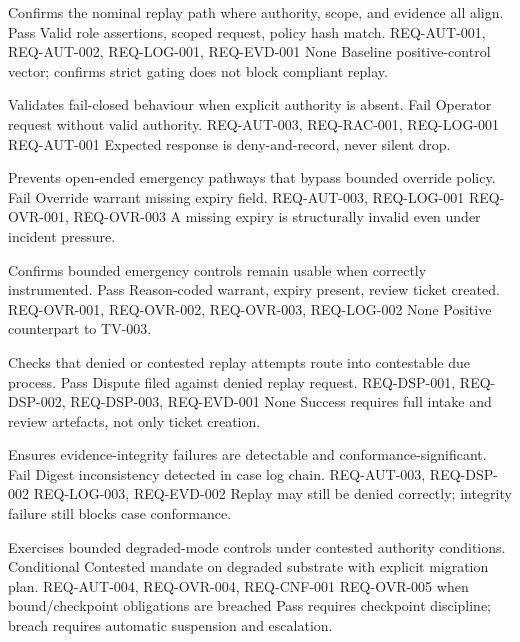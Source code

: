 \documentclass[11pt]{article}
\theoremstyle{definition}
\theoremstyle{plain}
\theoremstyle{remark}
\begin{document}
{Confirms the nominal replay path where authority, scope, and evidence all align.}
{Pass}
{Valid role assertions, scoped request, policy hash match.}
{REQ-AUT-001, REQ-AUT-002, REQ-LOG-001, REQ-EVD-001}
{None}
{Baseline positive-control vector; confirms strict gating does not block compliant replay.}

{Validates fail-closed behaviour when explicit authority is absent.}
{Fail}
{Operator request without valid authority.}
{REQ-AUT-003, REQ-RAC-001, REQ-LOG-001}
{REQ-AUT-001}
{Expected response is deny-and-record, never silent drop.}

{Prevents open-ended emergency pathways that bypass bounded override policy.}
{Fail}
{Override warrant missing expiry field.}
{REQ-AUT-003, REQ-LOG-001}
{REQ-OVR-001, REQ-OVR-003}
{A missing expiry is structurally invalid even under incident pressure.}

{Confirms bounded emergency controls remain usable when correctly instrumented.}
{Pass}
{Reason-coded warrant, expiry present, review ticket created.}
{REQ-OVR-001, REQ-OVR-002, REQ-OVR-003, REQ-LOG-002}
{None}
{Positive counterpart to TV-003.}

{Checks that denied or contested replay attempts route into contestable due process.}
{Pass}
{Dispute filed against denied replay request.}
{REQ-DSP-001, REQ-DSP-002, REQ-DSP-003, REQ-EVD-001}
{None}
{Success requires full intake and review artefacts, not only ticket creation.}

{Ensures evidence-integrity failures are detectable and conformance-significant.}
{Fail}
{Digest inconsistency detected in case log chain.}
{REQ-AUT-003, REQ-DSP-002}
{REQ-LOG-003, REQ-EVD-002}
{Replay may still be denied correctly; integrity failure still blocks case conformance.}

{Exercises bounded degraded-mode controls under contested authority conditions.}
{Conditional}
{Contested mandate on degraded substrate with explicit migration plan.}
{REQ-AUT-004, REQ-OVR-004, REQ-CNF-001}
{REQ-OVR-005 when bound/checkpoint obligations are breached}
{Pass requires checkpoint discipline; breach requires automatic suspension and escalation.}
\end{document}
